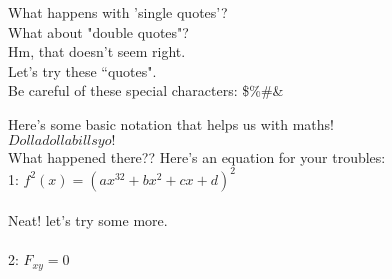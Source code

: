 \documentclass{article}
\begin{document}
 
What happens with 'single quotes'?\\
What about "double quotes"?\\
Hm, that doesn't seem right.\\
Let's try these ``quotes".\\
Be careful of these special characters: \$\%\#\&

\newpage 
\noindent  %
Here's some basic notation that helps us with maths!\\
$Dolla dolla bills yo!$\\
What happened there?? Here's an equation for your troubles:\\
1: $f^2(x) = (ax^{32} + bx^2 + cx + d)^2$\\~\\ 
Neat! let's try some more.\\~\\
2: $F_{xy} = 0$
\end{document}
